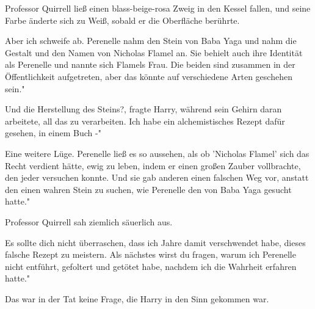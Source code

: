 Professor Quirrell ließ einen blass-beige-rosa Zweig in den Kessel fallen, und
seine Farbe änderte sich zu Weiß, sobald er die Oberfläche berührte.

\glqq Aber ich schweife ab. Perenelle nahm den Stein von Baba Yaga und nahm die
Gestalt und den Namen von Nicholas Flamel an. Sie behielt auch ihre Identität
als Perenelle und nannte sich Flamels Frau. Die beiden sind zusammen in der
Öffentlichkeit aufgetreten, aber das könnte auf verschiedene Arten geschehen
sein."

\glqq Und die Herstellung des Steins?\grqq{}, fragte Harry, während sein Gehirn
daran arbeitete, all das zu verarbeiten. \glqq Ich habe ein alchemistisches
Rezept dafür gesehen, in einem Buch -"

\glqq Eine weitere Lüge. Perenelle ließ es so aussehen, als ob 'Nicholas Flamel'
sich das Recht verdient hätte, ewig zu leben, indem er einen großen Zauber
vollbrachte, den jeder versuchen konnte. Und sie gab anderen einen falschen Weg
vor, anstatt den einen wahren Stein zu suchen, wie Perenelle den von Baba Yaga
gesucht hatte."

Professor Quirrell sah ziemlich säuerlich aus.

\glqq Es sollte dich nicht überraschen, dass ich Jahre damit verschwendet habe,
dieses falsche Rezept zu meistern. Als nächstes wirst du fragen, warum ich
Perenelle nicht entführt, gefoltert und getötet habe, nachdem ich die Wahrheit
erfahren hatte."

Das war in der Tat keine Frage, die Harry in den Sinn gekommen war.

